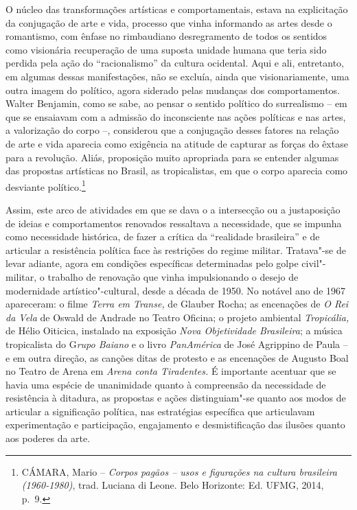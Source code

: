 O núcleo das transformações artísticas e comportamentais, estava na
explicitação da conjugação de arte e vida, processo que vinha informando
as artes desde o romantismo, com ênfase no rimbaudiano desregramento de
todos os sentidos como visionária recuperação de uma suposta unidade
humana que teria sido perdida pela ação do ``racionalismo'' da cultura
ocidental. Aqui e ali, entretanto, em algumas dessas manifestações, não
se excluía, ainda que visionariamente, uma outra imagem do político,
agora siderado pelas mudanças dos comportamentos. Walter Benjamin, como
se sabe, ao pensar o sentido político do surrealismo -- em que se
ensaiavam com a admissão do inconsciente nas ações políticas e nas
artes, a valorização do corpo --, considerou que a conjugação desses
fatores na relação de arte e vida aparecia como exigência na atitude de
capturar as forças do êxtase para a revolução. Aliás, proposição muito
apropriada para se entender algumas das propostas artísticas no Brasil,
as tropicalistas, em que o corpo aparecia como desviante
político.\footnote{\textsc{CÁMARA}, Mario -- \emph{Corpos pagãos -- usos e figurações
  na cultura brasileira (1960-1980)}, trad. Luciana di Leone. Belo
  Horizonte: Ed. \textsc{UFMG}, 2014, p.~9.}

Assim, este arco de atividades em que se dava o a intersecção ou a
justaposição de ideias e comportamentos renovados ressaltava a
necessidade, que se impunha como necessidade histórica, de fazer a
crítica da ``realidade brasileira'' e de articular a resistência
política face às restrições do regime militar. Tratava"-se de levar
adiante, agora em condições específicas determinadas pelo golpe
civil"-militar, o trabalho de renovação que vinha impulsionando o desejo
de modernidade artístico"-cultural, desde a década de 1950. No notável
ano de 1967 apareceram: o filme \emph{Terra em Transe,} de Glauber
Rocha; as encenações de \emph{O Rei da Vela} de Oswald de Andrade no
Teatro Oficina; o projeto ambiental \emph{Tropicália,} de Hélio
Oiticica, instalado na exposição \emph{Nova Objetividade Brasileira}; a
música tropicalista do G\emph{rupo Baiano} e o livro \emph{PanAmérica}
de José Agrippino de Paula -- e em outra direção, as canções ditas de
protesto e as encenações de Augusto Boal no Teatro de Arena em
\emph{Arena conta Tiradentes.} É importante acentuar que se havia uma
espécie de unanimidade quanto à compreensão da necessidade de
resistência à ditadura, as propostas e ações distinguiam"-se quanto aos
modos de articular a significação política, nas estratégias específica
que articulavam experimentação e participação, engajamento e
desmistificação das ilusões quanto aos poderes da arte.

